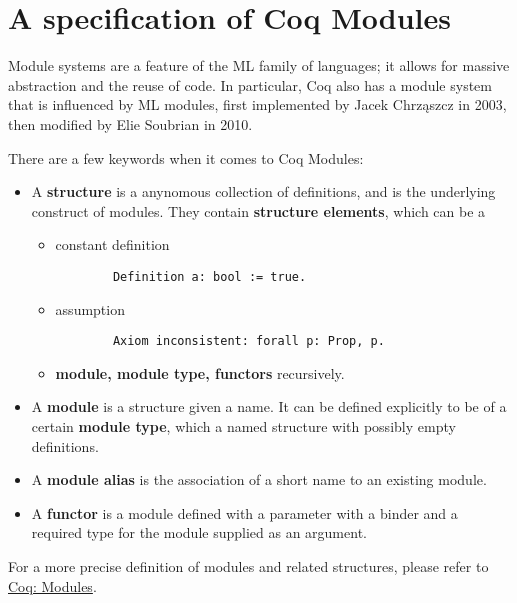 
\section{A specification of Coq Modules}
Module systems are  a feature of the ML family of languages; it allows
for massive abstraction and the reuse of code. In particular, Coq 
also has a module system that is influenced by ML modules, first 
implemented by Jacek Chrząszcz in 2003, then modified by Elie Soubrian
in 2010.

There are a few keywords when it comes to Coq Modules:
\begin{itemize}
\item A \textbf{structure} is a anynomous collection of definitions, and is the 
    underlying construct of modules. They contain \textbf{structure elements},
    which can be a
    \begin{itemize}
    \item constant definition
    \begin{verbatim}
        Definition a: bool := true.
    \end{verbatim}
    \item assumption
    \begin{verbatim}
        Axiom inconsistent: forall p: Prop, p.
    \end{verbatim}
    \item \textbf{module, module type, functors} recursively.
    \end{itemize}

\item A \textbf{module} is a structure given a name. It can be defined explicitly to be
    of a certain \textbf{module type}, which a named structure with possibly
    empty definitions.
\item A \textbf{module alias} is the association of a short name to an existing
    module.
\item A \textbf{functor} is a module defined with a parameter with a binder and
    a required type for the module supplied as an argument.
\end{itemize}

For a more precise definition of modules and related structures, please refer to
\href{https://coq.inria.fr/refman/language/core/modules.html}{Coq: Modules}.

